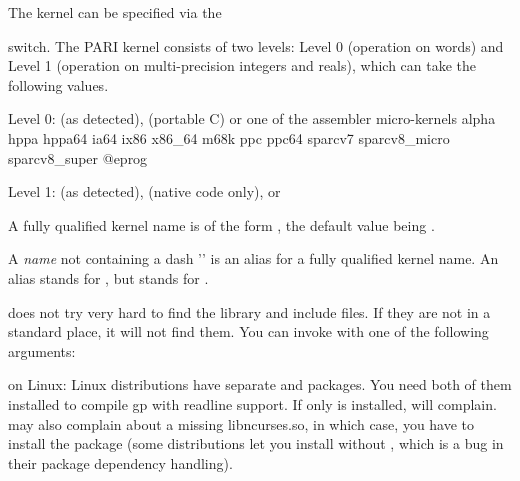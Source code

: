  The kernel can be specified via the


\noindent switch. The PARI kernel consists of two levels: Level 0 (operation
on words) and Level 1 (operation on multi-precision integers and reals),
which can take the following values.

Level 0:  (as detected),  (portable C) or
one of the assembler micro-kernels
\bprog
  alpha
  hppa hppa64
  ia64
  ix86 x86_64
  m68k
  ppc ppc64
  sparcv7 sparcv8_micro sparcv8_super
@eprog

Level 1:  (as detected),  (native code only), or 

\noindent\item A fully qualified kernel name is of the form
, the default value being .

\noindent\item A \emph{name} not containing a dash '\kbd{-}' is an alias
for a fully qualified kernel name. An alias stands for
, but  stands for .

 does not try very hard to find the  library and
include files. If they are not in a standard place, it will not find them.
You can invoke  with one of the following arguments:





\item on Linux: Linux distributions have separate  and
 packages. You need both of them installed to
compile gp with readline support. If only  is installed,
 will complain.  may also complain about a
missing libncurses.so, in which case, you have to install the
 package (some distributions let you install
 without , which is a bug in
their package dependency handling).

